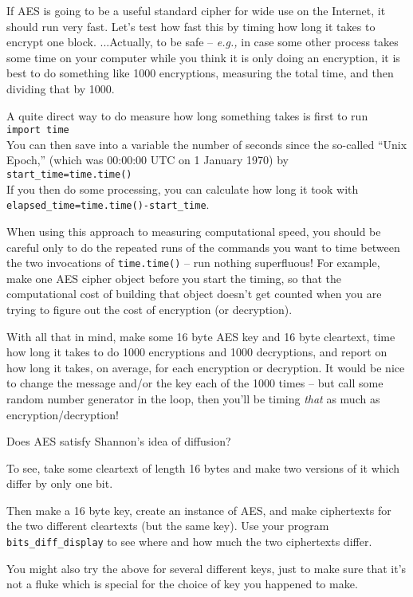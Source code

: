 \documentclass[12pt,letterpaper]{amsbook}
\theoremstyle{definition}
\theoremstyle{remark}
\numberwithin{figure}{section}
\numberwithin{exercise}{chapter}
\numberwithin{section}{chapter}
\numberwithin{equation}{section}
\numberwithin{table}{subsection}
\newcommand{\code}[1]{\colorbox{lg}{\texttt{#1}}}
\newcommand{\ix}[1]{{#1}\index{#1}}
\begin{document}
\vskip5mm
\begin{CTtcb}[label=ct:howfastAES]{}{}
 If AES is going to be a useful standard cipher for wide use on the
 Internet, it should run very fast.  Let's test how fast this by timing how
 long it takes to encrypt one block.  ...Actually, to be safe -- \textit{e.g.,}
 in case some other process takes some time on your computer while you think
 it is only doing an encryption, it is best to do something like 1000
 encryptions, measuring the total time, and then dividing that by 1000.

 A quite direct way to do measure how long something takes is first to run\\
 \hphantom{XXX}\code{import time}\\
 You can then save into a variable the number of seconds since the so-called
 ``Unix Epoch,'' (which was 00:00:00 UTC on 1 January 1970) by\\
 \hphantom{XXX}\code{start\_time=time.time()}\\
 If you then do some processing, you can calculate how long it took with\\
 \hphantom{XXX}\code{elapsed\_time=time.time()-start\_time}.

 When using this approach to measuring computational speed, you should
 be careful only to do the repeated runs of the commands you want to time
 between the two invocations of \code{time.time()} -- run nothing superfluous!
 For example, make one AES cipher object before you start the timing, so that
 the computational cost of building that object doesn't get counted when you
 are trying to figure out the cost of encryption (or decryption).

 With all that in mind, make some 16 byte AES key and 16 byte cleartext, time
 how long it takes to do 1000 encryptions and 1000 decryptions, and report on
 how long it takes, on average, for each encryption or decryption.  It would
 be nice to change the message and/or the key each of the 1000 times -- but
 call some random number generator in the loop, then you'll be timing
 \textit{that} as much as encryption/decryption!
\end{CTtcb}

\begin{CTtcb}[label=ct:diffusionAES]{}{}
 Does AES satisfy Shannon's idea of
 \ix{diffusion}?

 To see, take some cleartext of length 16 bytes and make two versions of it
 which differ by only one bit.

 Then make a 16 byte key, create an instance of AES, and make ciphertexts for
 the two different cleartexts (but the same key). Use your program
 \code{bits\_diff\_display} to see where and how much the two ciphertexts
 differ.

 You might also try the above for several different keys, just to make sure that
 it's not a fluke which is special for the choice of key you happened to make.
\end{CTtcb}
\end{document}
